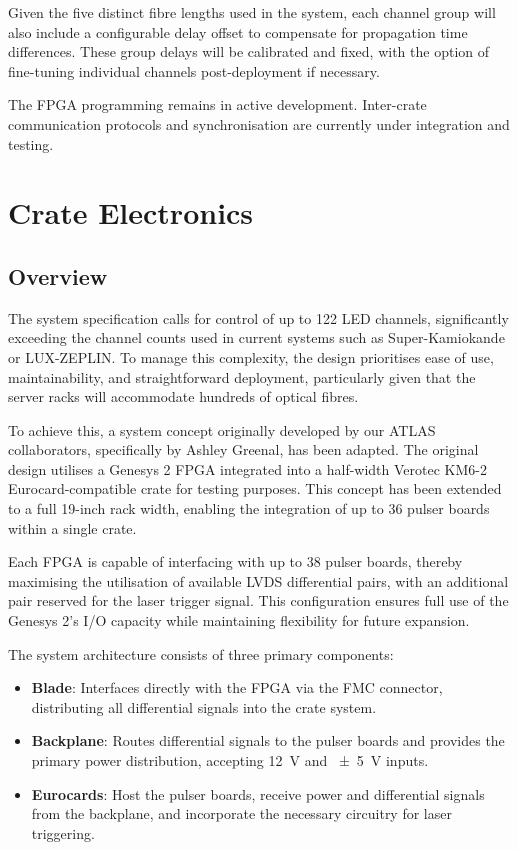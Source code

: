 \documentclass[a4paper,11pt]{article}
\begin{document}
Given the five distinct fibre lengths used in the system, each channel group will also include a configurable delay offset to compensate for propagation time differences. These group delays will be calibrated and fixed, with the option of fine-tuning individual channels post-deployment if necessary.

The FPGA programming remains in active development. Inter-crate communication protocols and synchronisation are currently under integration and testing.

\section{Crate Electronics}

\subsection{Overview}

The system specification calls for control of up to 122 LED channels, significantly exceeding the channel counts used in current systems such as Super-Kamiokande or LUX-ZEPLIN. To manage this complexity, the design prioritises ease of use, maintainability, and straightforward deployment, particularly given that the server racks will accommodate hundreds of optical fibres.

To achieve this, a system concept originally developed by our ATLAS collaborators, specifically by Ashley Greenal, has been adapted. The original design utilises a Genesys 2 FPGA integrated into a half-width Verotec KM6-2 \cite{KM6-2} Eurocard-compatible crate for testing purposes. This concept has been extended to a full 19-inch rack width, enabling the integration of up to 36 pulser boards within a single crate.

Each FPGA is capable of interfacing with up to 38 pulser boards, thereby maximising the utilisation of available LVDS differential pairs, with an additional pair reserved for the laser trigger signal. This configuration ensures full use of the Genesys 2’s I/O capacity while maintaining flexibility for future expansion.

The system architecture consists of three primary components:

\begin{itemize}
\item \textbf{Blade}: Interfaces directly with the FPGA via the FMC connector, distributing all differential signals into the crate system.
\item \textbf{Backplane}: Routes differential signals to the pulser boards and provides the primary power distribution, accepting \SI{12}{\volt} and \SI{\pm5}{\volt} inputs.
\item \textbf{Eurocards}: Host the pulser boards, receive power and differential signals from the backplane, and incorporate the necessary circuitry for laser triggering.
\end{itemize}
\end{document}
